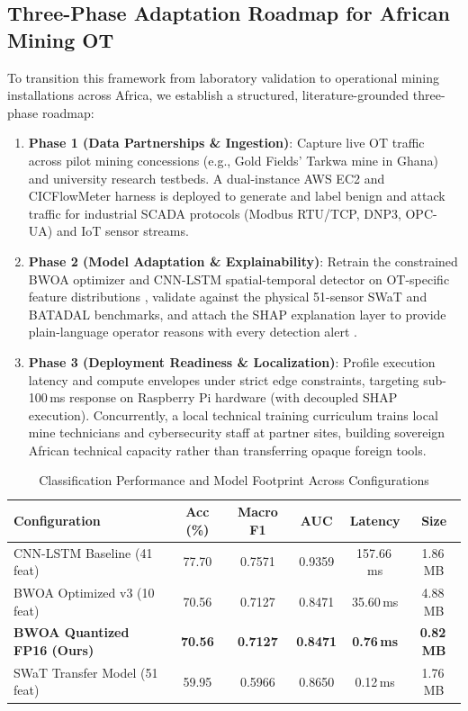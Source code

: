 \documentclass[conference]{IEEEtran}
\begin{document}
\subsection{Three-Phase Adaptation Roadmap for African Mining OT}
To transition this framework from laboratory validation to operational mining installations across Africa, we establish a structured, literature-grounded three-phase roadmap:
\begin{enumerate}
    \item \textbf{Phase 1 (Data Partnerships \& Ingestion)}: Capture live OT traffic across pilot mining concessions (e.g., Gold Fields' Tarkwa mine in Ghana) and university research testbeds. A dual-instance AWS EC2 and CICFlowMeter harness is deployed to generate and label benign and attack traffic for industrial SCADA protocols (Modbus RTU/TCP, DNP3, OPC-UA) and IoT sensor streams.
    \item \textbf{Phase 2 (Model Adaptation \& Explainability)}: Retrain the constrained BWOA optimizer and CNN-LSTM spatial-temporal detector on OT-specific feature distributions \cite{kheddar2023deep}, validate against the physical 51-sensor SWaT and BATADAL benchmarks, and attach the SHAP explanation layer to provide plain-language operator reasons with every detection alert \cite{oyedotun2025towards}.
    \item \textbf{Phase 3 (Deployment Readiness \& Localization)}: Profile execution latency and compute envelopes under strict edge constraints, targeting sub-100\,ms response on Raspberry Pi hardware (with decoupled SHAP execution). Concurrently, a local technical training curriculum trains local mine technicians and cybersecurity staff at partner sites, building sovereign African technical capacity rather than transferring opaque foreign tools.
\end{enumerate}

\begin{table}[htbp]
\caption{Classification Performance and Model Footprint Across Configurations}
\label{tab:model_metrics}
\centering
\begin{tabularx}{\columnwidth}{lccccc}
\toprule
\textbf{Configuration} & \textbf{Acc (\%)} & \textbf{Macro F1} & \textbf{AUC} & \textbf{Latency} & \textbf{Size} \\
\midrule
CNN-LSTM Baseline (41 feat) & 77.70 & 0.7571 & 0.9359 & 157.66\,ms & 1.86\,MB \\
BWOA Optimized v3 (10 feat) & 70.56 & 0.7127 & 0.8471 & 35.60\,ms & 4.88\,MB \\
\textbf{BWOA Quantized FP16 (Ours)} & \textbf{70.56} & \textbf{0.7127} & \textbf{0.8471} & \textbf{0.76\,ms} & \textbf{0.82\,MB} \\
SWaT Transfer Model (51 feat) & 59.95 & 0.5966 & 0.8650 & 0.12\,ms & 1.76\,MB \\
\bottomrule
\end{tabularx}
\end{table}
\end{document}
